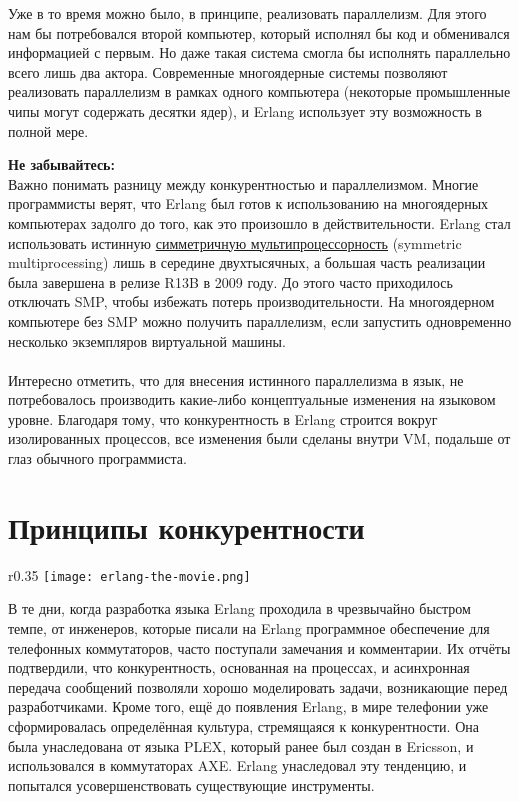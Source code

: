 Уже в то время можно было, в принципе, реализовать параллелизм.
Для этого нам бы потребовался второй компьютер, который исполнял бы код и обменивался информацией с первым.
Но даже такая система смогла бы исполнять параллельно всего лишь два актора.
Современные многоядерные системы позволяют реализовать параллелизм в рамках одного компьютера (некоторые промышленные чипы могут содержать десятки ядер), и Erlang использует эту возможность в полной мере.\\
\colorbox{lorange}
{
\begin{minipage}{1.0\linewidth}
    \textbf{Не забывайтесь:}\\
    Важно понимать разницу между конкурентностью и параллелизмом.
    Многие программисты верят, что Erlang был готов к использованию на многоядерных компьютерах задолго до того, как это произошло в действительности.
    Erlang стал использовать истинную \href{http://en.wikipedia.org/wiki/Symmetric\_multiprocessing}{симметричную мультипроцессорность} (symmetric multiprocessing) лишь в середине двухтысячных, а большая часть реализации была завершена в релизе R13B в 2009 году.
    До этого часто приходилось отключать SMP, чтобы избежать потерь производительности.
    На многоядерном компьютере без SMP можно получить параллелизм, если запустить одновременно несколько экземпляров виртуальной машины.\\
    \\
    Интересно отметить, что для внесения истинного параллелизма в язык, не потребовалось производить какие\--либо концептуальные изменения на языковом уровне.
    Благодаря тому, что конкурентность в Erlang строится вокруг изолированных процессов, все изменения были сделаны внутри VM, подальше от глаз обычного программиста.
\end{minipage}
}
\section{Принципы конкурентности}
\label{concepts-of-concurrency}
\begin{wrapfigure}{r}{0.35\linewidth}
    \texttt{[image: erlang-the-movie.png]}
\end{wrapfigure}
В те дни, когда разработка языка Erlang проходила в чрезвычайно быстром темпе, от инженеров, которые писали на Erlang программное обеспечение для телефонных коммутаторов, часто поступали замечания и комментарии.
Их отчёты подтвердили, что конкурентность, основанная на процессах, и асинхронная передача сообщений позволяли хорошо моделировать задачи, возникающие перед разработчиками.
Кроме того, ещё до появления Erlang, в мире телефонии уже сформировалась определённая культура, стремящаяся к конкурентности.
Она была унаследована от языка PLEX, который ранее был создан в Ericsson, и использовался в коммутаторах AXE.
Erlang унаследовал эту тенденцию, и попытался усовершенствовать существующие инструменты.

